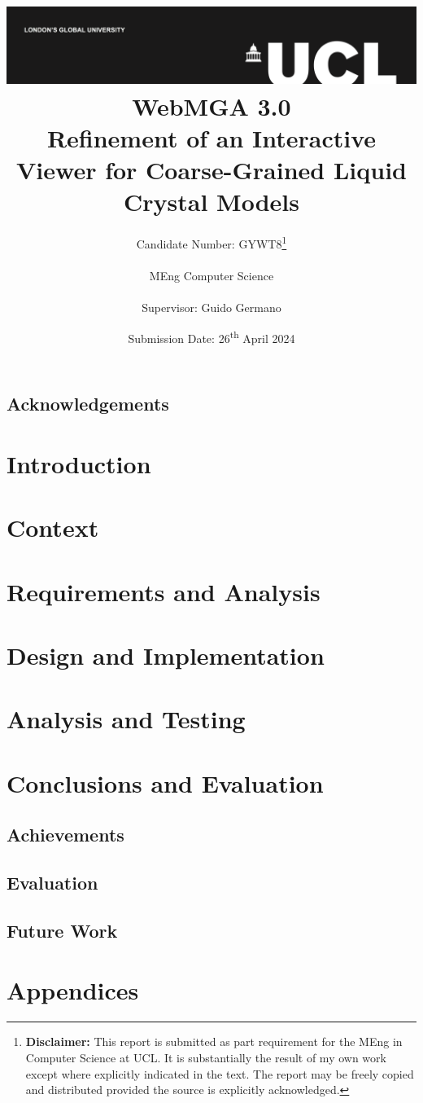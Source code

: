 \documentclass[a4paper,12pt]{report}
\title{
{\vspace{-14em} \includegraphics[width=\textwidth]{assets/images/ucl}}\\
{{\Huge WebMGA 3.0}}\\
{\large Refinement of an Interactive Viewer for Coarse-Grained Liquid Crystal Models}\\
}
\date{Submission Date: 26\textsuperscript{th} April 2024}
\author{Candidate Number: GYWT8\thanks{
{\bf Disclaimer:}
This report is submitted as part requirement for the MEng in Computer Science at UCL. It is
substantially the result of my own work except where explicitly indicated in the text. The report may be freely copied and distributed provided the source is explicitly acknowledged.}
\\ \\
MEng Computer Science\\ \\
Supervisor: Guido Germano}
\begin{document}
 
\onehalfspacing
\maketitle

\begin{abstract}

\end{abstract}

\tableofcontents

\setcounter{page}{1}
\section{Acknowledgements}

\chapter{Introduction}


\chapter{Context}


\chapter{Requirements and Analysis}


\chapter{Design and Implementation}








\chapter{Analysis and Testing}


\chapter{Conclusions and Evaluation}
\section{Achievements}


\section{Evaluation}

\section{Future Work}

\appendix

\printbibliography

\chapter{Appendices}
%
\end{document}
